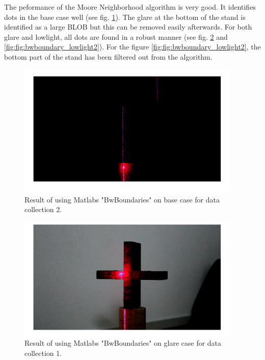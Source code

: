 The peformance of the Moore Neighborhood algorithm is very good. It identifies dots in the base case well (see fig. \ref{fig:bwboundary_base2}). The glare at the bottom of the stand is identified as a large BLOB but this can be removed easily afterwards. For both glare and lowlight, all dots are found in a robust manner (see fig. \ref{fig:bwboundary_glare1} and \ref{fig:fig:bwboundary_lowlight2}). For the figure \ref{fig:fig:bwboundary_lowlight2}, the bottom part of the stand has been filtered out from the algorithm. 
\begin{figure}[H]
    \centering
    \includegraphics[width=0.95\textwidth]{figures/ImageAnalysis/ContourSearch/bwboundaries_base2.png}
    \caption{Result of using Matlabs "BwBoundaries" on base case for data collection 2.}
    \label{fig:bwboundary_base2}
\end{figure}
\begin{figure}[H]
    \centering
    \includegraphics[width=0.95\textwidth]{figures/ImageAnalysis/ContourSearch/bwboundaries_glare1.png}
    \caption{Result of using Matlabs "BwBoundaries" on glare case for data collection 1.}
    \label{fig:bwboundary_glare1}
\end{figure}
